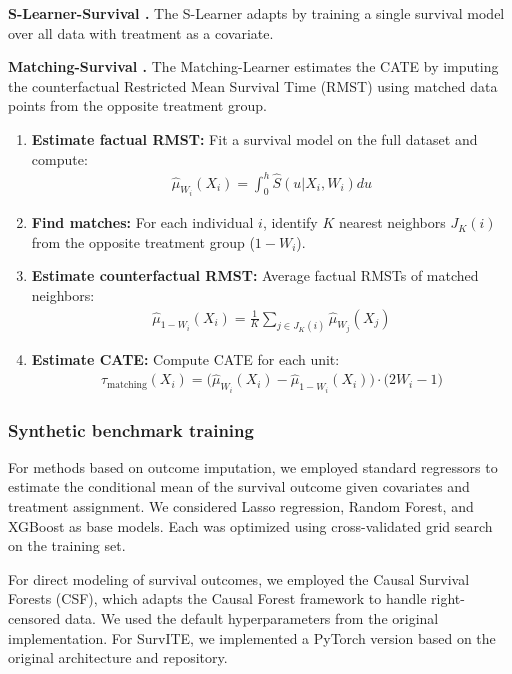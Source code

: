 \textbf{S-Learner-Survival \citep{bo2024ameta,noroozizadeh2025impact}.}
The S-Learner adapts by training a single survival model over all data with treatment as a covariate.

\textbf{Matching-Survival \citep{noroozizadeh2025impact}.}
The Matching-Learner estimates the CATE by imputing the counterfactual Restricted Mean Survival Time (RMST) using matched data points from the opposite treatment group.

\begin{enumerate}
    \item \textbf{Estimate factual RMST:} Fit a survival model on the full dataset and compute:
    \begin{align*}
        \widehat{\mu}_{W_i}(X_i) = \int_0^h \widehat{S}(u | X_i, W_i) du
    \end{align*}
    \item \textbf{Find matches:} For each individual $i$, identify $K$ nearest neighbors $J_K(i)$ from the opposite treatment group (\(1-W_i\)).
    \item \textbf{Estimate counterfactual RMST:} Average factual RMSTs of matched neighbors:
    \begin{align*}
        \widehat{\mu}_{1-W_i}(X_i) = \frac{1}{K} \sum_{j \in J_K(i)} \widehat{\mu}_{W_j}(X_j)
    \end{align*}
    \item \textbf{Estimate CATE:} Compute CATE for each unit:
    \begin{align*}
        \widehat{\tau}_{\text{matching}}(X_i) = \big(\widehat{\mu}_{W_i}(X_i) - \widehat{\mu}_{1-W_i} (X_i)\big) \cdot \big(2 W_i - 1 \big)
    \end{align*}
\end{enumerate}

\subsubsection{Synthetic benchmark training}\label{ch04:app:method_settings}

For methods based on outcome imputation, we employed standard regressors to estimate the conditional mean of the survival outcome given covariates and treatment assignment.
We considered Lasso regression, Random Forest, and XGBoost as base models.
Each was optimized using cross-validated grid search on the training set.

For direct modeling of survival outcomes, we employed the Causal Survival Forests (CSF), which adapts the Causal Forest framework to handle right-censored data.
We used the default hyperparameters from the original implementation.
For SurvITE, we implemented a PyTorch version based on the original architecture and repository.

